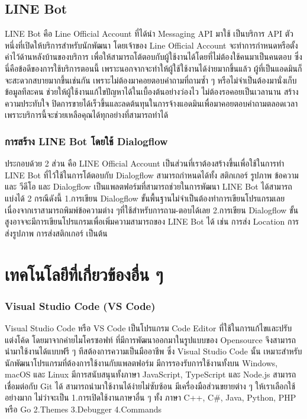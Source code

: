 \subsection{LINE Bot} 
\quad LINE Bot คือ Line Official Account ที่ได้นำ Messaging API มาใช้ เป็นบริการ API ตัวหนึ่งที่เปิดให้บริการสำหรับนักพัฒนา โดยเจ้าของ Line Official Account จะทำการกำหนดหรือตั้งค่าไว้ด้านหลังบ้านของบริการ เพื่อให้สามารถโต้ตอบกับผู้ใช้งานได้โดยที่ไม่ต้องใช้คนมาเป็นคนตอบ ซึ่งนี่คือข้อดีของการใช้บริการตอนนี้ เพราะนอกจากจะทำให้ผู้ใช้ใช้งานได้ง่ายมากขึ้นแล้ว ผู้ที่เป็นแอดมินก็จะสะดวกสบายมากขึ้นเช่นกัน เพราะไม่ต้องมาคอยตอบคำถามที่ถามซ้ำ ๆ หรือไม่จำเป็นต้องมานั่งเก็บข้อมูลทีละคน ช่วยให้ผู้ใช้งานแก้ไขปัญหาได้ในเบื้องต้นอย่างว่องไว ไม่ต้องรอคอยเป็นเวลานาน สร้างความประทับใจ ปิดการขายได้เร็วขึ้นและลดต้นทุนในการจ้างแอดมินเพื่อมาคอยตอบคำถามตลอดเวลา เพราะบริการนี้จะช่วยเหลือคุณได้ทุกอย่างที่สามารถทำได้ 
\subsubsection{การสร้าง LINE Bot โดยใช้ Dialogflow} 
\quad ประกอบด้วย 2 ส่วน คือ LINE Official Account เป็นส่วนที่เราต้องสร้างขึ้นเพื่อใช้ในการทำ LINE Bot ที่ไว้ใช้ในการโต้ตอบกับ Dialogflow สามารถกำหนดได้ทั้ง สติกเกอร์ รูปภาพ ข้อความ และ วีดีโอ และ Dialogflow เป็นแพลตฟอร์มที่สามารถช่วยในการพัฒนา LINE Bot ได้สามารถแบ่งได้ 2 กรณีดังนี้ 1.การเขียน Dialogflow ขั้นพื้นฐานไม่จำเป็นต้องทำการเขียนโปรแกรมเลย เนื่องจากเราสามารถพิมพ์ข้อความต่าง ๆที่ใช้สำหรับการถาม-ตอบได้เลย 2.การเขียน Dialogflow ขั้นสูงอาจจะมีการเขียนโปรแกรมเพื่อเพิ่มความสามารถของ LINE Bot ได้ เช่น การส่ง Location การส่งรูปภาพ การส่งสติกเกอร์ เป็นต้น 
\cite{lineBot} \cite{lineDf} \cite{lineDfPyFb}
\section{เทคโนโลยีที่เกี่ยวข้องอื่น ๆ}

\subsubsection{Visual Studio Code (VS Code)}
\quad Visual Studio Code หรือ VS Code เป็นโปรแกรม Code Editor ที่ใช้ในการแก้ไขและปรับแต่งโค้ด โดยมาจากค่ายไมโครซอฟท์ ที่มีการพัฒนาออกมาในรูปแบบของ Opensource จึงสามารถนำมาใช้งานได้แบบฟรี ๆ ทีสต้องการความเป็นมืออาชีพ ซึ่ง Visual Studio Code นั้น เหมาะสำหรับนักพัฒนาโปรแกรมที่ต้องการใช้งานกับแพลตฟอร์ม มีการรองรับการใช้งานทั้งบน Windows, macOS และ Linux มีการสนับสนุนทั้งภาษา  JavaScript, TypeScript และ Node.js สามารถเชื่อมต่อกับ  Git ได้ สามารถนำมาใช้งานได้ง่ายไม่ซับซ้อน มีเครื่องมือส่วนขยายต่าง ๆ ให้เราเลือกใช้อย่างมาก ไม่ว่าจะเป็น 1.การเปิดใช้งานภาษาอื่น ๆ ทั้ง ภาษา  C++,  C\#, Java, Python, PHP หรือ Go  2.Themes 3.Debugger 4.Commands 
\cite{vscode}
